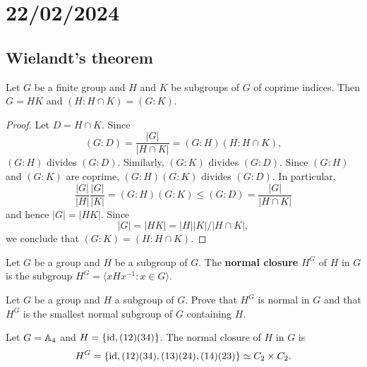 \section{22/02/2024}

\subsection{Wielandt's theorem}

\begin{lemma}
	\label{lemma:4Wielandt}
	Let $G$ be a finite group and $H$ and $K$ be subgroups of $G$ 
        of coprime indices. Then $G=HK$ and $(H:H\cap K)=(G:K)$.
\end{lemma}

\begin{proof}
	Let $D=H\cap K$. Since 
	\[
	(G:D)=\frac{|G|}{|H\cap K|}=(G:H)(H:H\cap K),
	\]
	$(G:H)$ divides $(G:D)$. Similarly, $(G:K)$ divides 
	$(G:D)$. Since $(G:H)$ and $(G:K)$ are coprime, $(G:H)(G:K)$
	divides $(G:D)$. In particular, 
	\[
	\frac{|G|}{|H|}\frac{|G|}{|K|}=(G:H)(G:K)\leq (G:D)=\frac{|G|}{|H\cap K|} 
	\]
	and hence $|G|=|HK|$. Since 
 \[
 |G|=|HK|=|H||K|/|H\cap K|,
 \]
 we conclude that 
	$(G:K)=(H:H\cap K)$.
\end{proof}

\begin{definition}
Let $G$ be a group and $H$ be a subgroup of $G$. The 
\textbf{normal closure} $H^G$ of $H$ in $G$ is the subgroup 
$H^G=\langle xHx^{-1}:x\in G\rangle$.
\end{definition}

\begin{exercise}
	Let $G$ be a group and $H$ a subgroup of $G$. Prove that $H^G$ is normal in $G$ and that 
	$H^G$ is the smallest normal subgroup of $G$ containing $H$. 
\end{exercise}


\begin{example}
Let $G=\mathbb{A}_4$ and $H=\{\operatorname{id},(12)(34)\}$. The normal closure of $H$ in $G$
is 
 \[
 H^G=\{\operatorname{id},(12)(34),(13)(24),(14)(23)\}\simeq C_2\times C_2.
 \]
\end{example}

